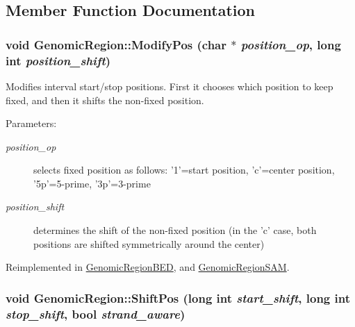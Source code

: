  

\subsection{Member Function Documentation}
\hypertarget{classGenomicRegion_0721b07af0850057e4ab9cd416ecac2f}{
\subsubsection[ModifyPos]{\setlength{\rightskip}{0pt plus 5cm}void GenomicRegion::ModifyPos (char $\ast$ {\em position\_\-op}, \/  long int {\em position\_\-shift})}}
\label{classGenomicRegion_0721b07af0850057e4ab9cd416ecac2f}


Modifies interval start/stop positions. First it chooses which position to keep fixed, and then it shifts the non-fixed position. 

\begin{Desc}
\item[Parameters:]
\begin{description}
\item[{\em position\_\-op}]selects fixed position as follows: '1'=start position, 'c'=center position, '5p'=5-prime, '3p'=3-prime \item[{\em position\_\-shift}]determines the shift of the non-fixed position (in the 'c' case, both positions are shifted symmetrically around the center) \end{description}
\end{Desc}


Reimplemented in \hyperlink{classGenomicRegionBED_c515c70f443db400f911452ed359433b}{GenomicRegionBED}, and \hyperlink{classGenomicRegionSAM_353207352073db00dee0a9b620dca197}{GenomicRegionSAM}.\hypertarget{classGenomicRegion_0ee8c165839c79afdc586f8b5e07788e}{
\subsubsection[ShiftPos]{\setlength{\rightskip}{0pt plus 5cm}void GenomicRegion::ShiftPos (long int {\em start\_\-shift}, \/  long int {\em stop\_\-shift}, \/  bool {\em strand\_\-aware})}}
\label{classGenomicRegion_0ee8c165839c79afdc586f8b5e07788e}


